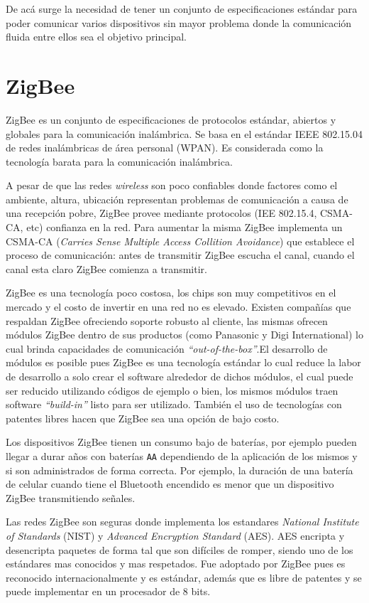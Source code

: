 \documentclass[10pt,journal,compsoc]{IEEEtran}
\begin{document}
De acá surge la necesidad de tener un conjunto de especificaciones estándar para poder comunicar varios dispositivos sin mayor problema donde la comunicación fluida entre ellos sea el objetivo principal. 


\section{ZigBee}

ZigBee es  un conjunto de especificaciones de protocolos estándar, abiertos y globales para la comunicación inalámbrica. Se basa en el estándar IEEE 802.15.04 de redes inalámbricas de área personal (WPAN). Es considerada como la tecnología barata para la comunicación inalámbrica.

A pesar de que las redes \emph{wireless} son poco confiables donde factores como el ambiente, altura, ubicación representan problemas de comunicación a causa de una recepción pobre, ZigBee provee mediante protocolos (IEE 802.15.4, CSMA-CA, etc) confianza en la red. Para aumentar la misma ZigBee implementa un CSMA-CA (\emph{Carries Sense Multiple Access Collition Avoidance}) que establece el proceso de comunicación: antes de transmitir ZigBee escucha el canal, cuando el canal esta claro ZigBee comienza a transmitir.

ZigBee es una tecnología poco costosa, los chips son muy competitivos en el mercado y el costo de invertir en una red no es elevado. Existen compañías \cite{bombal} que respaldan ZigBee ofreciendo soporte robusto al cliente, las mismas ofrecen módulos ZigBee dentro de sus productos (como Panasonic y Digi International) lo cual brinda capacidades de comunicación \emph{``out-of-the-box''}.El desarrollo de módulos es posible pues ZigBee es una tecnología estándar lo cual reduce la labor de desarrollo a solo crear el software alrededor de dichos módulos, el cual puede ser reducido utilizando códigos de ejemplo o bien, los mismos módulos traen software \emph{``build-in''} listo para ser utilizado. También el uso de tecnologías con patentes libres hacen que  ZigBee sea una opción de bajo costo.

Los dispositivos ZigBee tienen un consumo bajo de baterías, por ejemplo pueden llegar a durar años con baterías \texttt{AA} dependiendo de la aplicación de los mismos y si son administrados de forma correcta. Por ejemplo, la duración de una batería de celular cuando tiene el Bluetooth encendido es menor que un dispositivo ZigBee transmitiendo señales. 

Las redes ZigBee son seguras donde implementa los estandares \emph{National Institute of Standards} (NIST) y \emph{Advanced Encryption Standard} (AES). AES encripta y desencripta paquetes de forma tal que son difíciles de romper, siendo uno de los estándares mas conocidos y mas respetados. Fue adoptado por ZigBee pues es reconocido internacionalmente y es estándar, además que es libre de patentes y se puede implementar en un procesador de 8 bits. 
\end{document}
